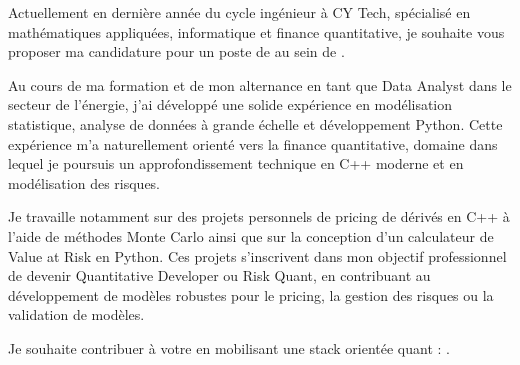 Actuellement en dernière année du cycle ingénieur à CY Tech, spécialisé en mathématiques appliquées, informatique et finance quantitative, je souhaite vous proposer ma candidature pour un poste de \textbf{\targetRole{}} au sein de \textbf{\targetCompany{}}.

Au cours de ma formation et de mon alternance en tant que Data Analyst dans le secteur de l'énergie, j'ai développé une solide expérience en modélisation statistique, analyse de données à grande échelle et développement Python. Cette expérience m'a naturellement orienté vers la finance quantitative, domaine dans lequel je poursuis un approfondissement technique en C++ moderne et en modélisation des risques.

Je travaille notamment sur des projets personnels de pricing de dérivés en C++ à l'aide de méthodes Monte Carlo ainsi que sur la conception d'un calculateur de Value at Risk en Python. Ces projets s'inscrivent dans mon objectif professionnel de devenir Quantitative Developer ou Risk Quant, en contribuant au développement de modèles robustes pour le pricing, la gestion des risques ou la validation de modèles.

Je souhaite contribuer à votre \textbf{\targetDesk{}} en mobilisant une stack orientée quant : \textbf{\targetTechStack{}}.

\targetWhyCompany{}

\targetClosing{}
